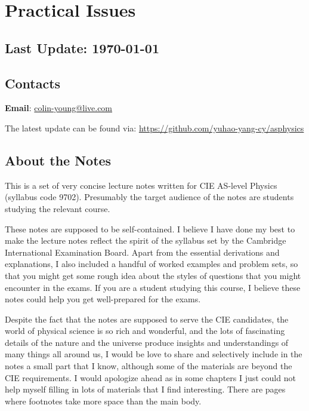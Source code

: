 \section*{Practical Issues}

\subsection*{Last Update: \today}


\subsection*{Contacts}
\textbf{Email}: \url{colin-young@live.com}

The latest update can be found via: \url{https://github.com/yuhao-yang-cy/asphysics}

\subsection*{About the Notes}

This is a set of very concise lecture notes written for CIE AS-level Physics (syllabus code 9702). Presumably the target audience of the notes are students studying the relevant course.

These notes are supposed to be self-contained. I believe I have done my best to make the lecture notes reflect the spirit of the syllabus set by the Cambridge International Examination Board. Apart from the essential derivations and explanations, I also included a handful of worked examples and problem sets, so that you might get some rough idea about the styles of questions that you might encounter in the exams. If you are a student studying this course, I believe these notes could help you get well-prepared for the exams.

Despite the fact that the notes are supposed to serve the CIE candidates, the world of physical science is so rich and wonderful, and the lots of fascinating details of the nature and the universe produce insights and understandings of many things all around us, I would be love to share and selectively include in the notes a small part that I know, although some of the materials are beyond the CIE requirements. I would apologize ahead as in some chapters I just could not help myself filling in lots of materials that I find interesting. There are pages where footnotes take more space than the main body.

